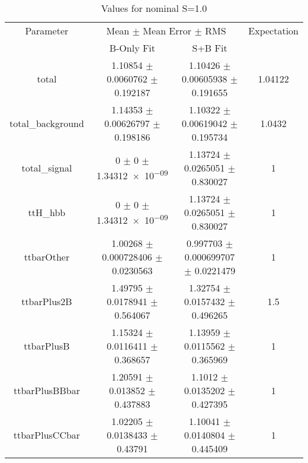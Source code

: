 \begin{table}
\centering
\caption{Values for nominal S=1.0}
\begin{tabular}{cccc}
\toprule
Parameter & \multicolumn{2}{c}{Mean $\pm$ Mean Error $\pm$ RMS} & Expectation\\
 & B-Only Fit & S+B Fit & \\
\midrule
total & \num{1.10854} $\pm$ \num{0.0060762} $\pm$ \num{0.192187} & \num{1.10426} $\pm$ \num{0.00605938} $\pm$ \num{0.191655} & \num{1.04122}\\
total\_background & \num{1.14353} $\pm$ \num{0.00626797} $\pm$ \num{0.198186} & \num{1.10322} $\pm$ \num{0.00619042} $\pm$ \num{0.195734} & \num{1.0432}\\
total\_signal & \num{0} $\pm$ \num{0} $\pm$ \num{1.34312e-09} & \num{1.13724} $\pm$ \num{0.0265051} $\pm$ \num{0.830027} & \num{1}\\
ttH\_hbb & \num{0} $\pm$ \num{0} $\pm$ \num{1.34312e-09} & \num{1.13724} $\pm$ \num{0.0265051} $\pm$ \num{0.830027} & \num{1}\\
ttbarOther & \num{1.00268} $\pm$ \num{0.000728406} $\pm$ \num{0.0230563} & \num{0.997703} $\pm$ \num{0.000699707} $\pm$ \num{0.0221479} & \num{1}\\
ttbarPlus2B & \num{1.49795} $\pm$ \num{0.0178941} $\pm$ \num{0.564067} & \num{1.32754} $\pm$ \num{0.0157432} $\pm$ \num{0.496265} & \num{1.5}\\
ttbarPlusB & \num{1.15324} $\pm$ \num{0.0116411} $\pm$ \num{0.368657} & \num{1.13959} $\pm$ \num{0.0115562} $\pm$ \num{0.365969} & \num{1}\\
ttbarPlusBBbar & \num{1.20591} $\pm$ \num{0.013852} $\pm$ \num{0.437883} & \num{1.1012} $\pm$ \num{0.0135202} $\pm$ \num{0.427395} & \num{1}\\
ttbarPlusCCbar & \num{1.02205} $\pm$ \num{0.0138433} $\pm$ \num{0.43791} & \num{1.10041} $\pm$ \num{0.0140804} $\pm$ \num{0.445409} & \num{1}\\
\bottomrule
\end{tabular}
\end{table}